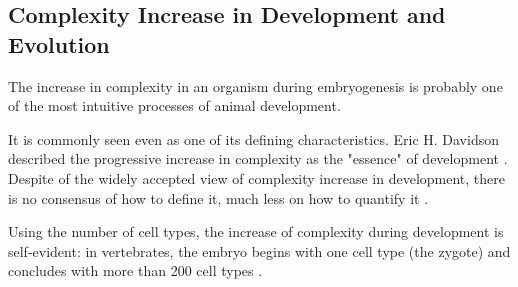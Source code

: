 \subsection{Complexity Increase in Development and Evolution}

The increase in complexity in an organism during embryogenesis is probably one of the most intuitive processes of animal development.

It is commonly seen even as one of its defining characteristics.
Eric H. Davidson described the progressive increase in complexity as the "essence" of development \citep{Davidson2001}. Despite of the widely accepted view of complexity increase in development, there is no consensus of how to define it, much less on how to quantify it \citep{susan2000ontogeny}.


Using the number of cell types, the increase of complexity during development is self-evident: in vertebrates, the embryo begins with one cell type (the zygote) and concludes with more than 200 cell types \citep{Alberts1994}. 


%
%



